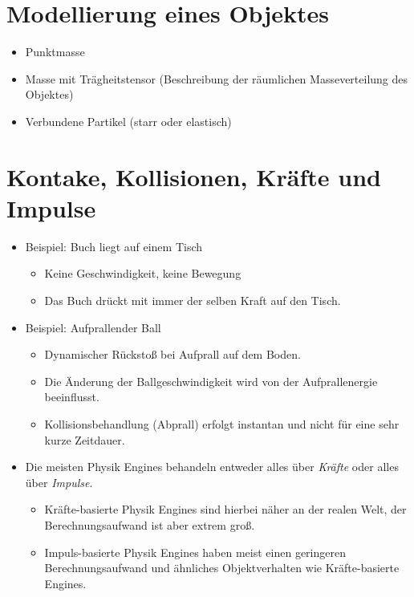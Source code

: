 \documentclass[a4paper, 11pt, accentcolor = tud3b]{tudreport}
\begin{document}
        \section{Modellierung eines Objektes} %
            \begin{itemize}
            	\item Punktmasse
            	\item Masse mit Trägheitstensor (Beschreibung der räumlichen Masseverteilung des Objektes)
            	\item Verbundene Partikel (starr oder elastisch)
            \end{itemize}

        \section{Kontake, Kollisionen, Kräfte und Impulse} %
	        \begin{itemize}
	        	\item Beispiel: Buch liegt auf einem Tisch
		        	\begin{itemize}
		        		\item Keine Geschwindigkeit, keine Bewegung
		        		\item Das Buch drückt mit immer der selben Kraft auf den Tisch.
		        	\end{itemize}
		        \item Beispiel: Aufprallender Ball
			        \begin{itemize}
			        	\item Dynamischer Rückstoß bei Aufprall auf dem Boden.
			        	\item Die Änderung der Ballgeschwindigkeit wird von der Aufprallenergie beeinflusst.
			        	\item Kollisionsbehandlung (Abprall) erfolgt instantan und nicht für eine sehr kurze Zeitdauer.
			        \end{itemize}
			    \item Die meisten Physik Engines behandeln entweder alles über \textit{Kräfte} oder alles über \textit{Impulse}.
				    \begin{itemize}
				    	\item Kräfte-basierte Physik Engines sind hierbei näher an der realen Welt, der Berechnungsaufwand ist aber extrem groß.
				    	\item Impuls-basierte Physik Engines haben meist einen geringeren Berechnungsaufwand und ähnliches Objektverhalten wie Kräfte-basierte Engines.
				    \end{itemize}
	        \end{itemize}
\end{document}
